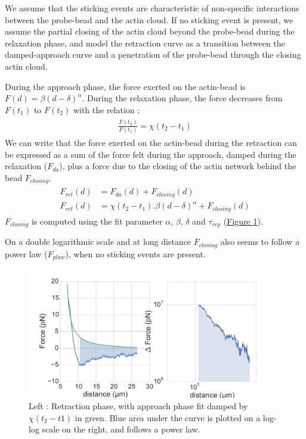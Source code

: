 \documentclass[A4paperpaper,11pt,english]{sphinxmanual}
\begin{document}
We assume that the sticking events are characteristic of non-specific interactions
between the probe-bead and the actin cloud. If no sticking event
is present, we assume the partial closing of the actin cloud beyond the
probe-bead during the relaxation phase, and model the retraction curve as a
transition between the damped-approach curve and a penetration of the probe-bead through the closing actin cloud.

During the approach phase, the force exerted on the actin-bead is
\(F(d)=\beta(d-\delta)^\alpha\). During the relaxation phase, the force
decreases from \(F(t_1)\) to \(F(t_2)\) with the relation :
\label{index-latex:equation-eqa311}\begin{gather}
\begin{split}\frac{F(t_2)}{F(t_1)} = \chi(t_2-t_1)\end{split}\label{index-latex-eqa311}
\end{gather}
We can write that the force exerted on the actin-bead during the retraction  can be expressed as a sum of the force felt during the approach, damped during the
relaxation (\(F_{da}\)), plus a force due to the closing of the actin
network behind the bead \(F_{closing}\).
\label{index-latex:equation-eqa312}\begin{gather}
\begin{split}F_{ret}(d) &= F_{da}(d) + F_{closing}(d)\\
F_{ret}(d) &= \chi(t_2-t_1).\beta(d-\delta)^\alpha+ F_{closing}(d)\end{split}\label{index-latex-eqa312}
\end{gather}
\(F_{closing}\) is computed using the fit parameter \(\alpha\), \(\beta\), \(\delta\) and \(\tau_{rep}\) (\hyperref[index-latex:retract-powerlaw]{Figure  \ref*{index-latex:retract-powerlaw}}).

On a double logarithmic scale and at long distance \(F_{closing}\) also seems to
follow a power law (\(F_{plaw}\)), when no sticking events are present.
\begin{figure}[htbp]
\centering
\capstart

\includegraphics[width=1.000\linewidth]{retract-powerlaw.pdf}
\caption{Left : Retraction phase, with approach phase fit damped by
\(\chi(t_2-t1)\) in green. Blue area under the curve is plotted on a
log-log scale on the right, and follows a power law.}\label{index-latex:retract-powerlaw}\end{figure}
\end{document}
